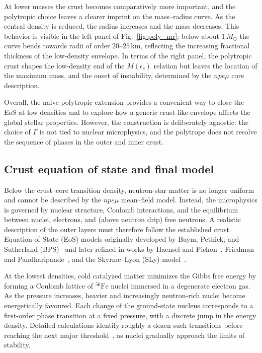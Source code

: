 At lower masses the crust becomes comparatively more important, and the
polytropic choice leaves a clearer imprint on the mass–radius curve. As
the central density is reduced, the radius increases and the
mass decreases. This behavior
is visible in the left panel of Fig.~\ref{fig:poly_mr}: below about
$1\,M_{\odot}$ the curve bends towards radii of order $20$–$25\,$km,
reflecting the increasing fractional thickness of the low-density
envelope. In terms of the right panel, the polytropic crust shapes the
low-density end of the $M(\epsilon_{c})$ relation but leaves the location
of the maximum mass, and the onset of instability, 
determined by the $npe\mu$ core description.

Overall, the naive polytropic extension provides a convenient way to close
the EoS at low densities and to explore how a generic crust-like envelope
affects the global stellar properties. However, the construction is
deliberately agnostic: the choice of $\Gamma$ is not tied to nuclear
microphysics, and the polytrope does not resolve the sequence of phases in
the outer and inner crust.


\subsection*{Crust equation of state and final model}
\label{subsec:crust_results}

Below the crust--core transition density, neutron-star matter is no longer
uniform and cannot be described by the $npe\mu$ mean–field model. Instead,
the microphysics is governed by nuclear structure, Coulomb interactions, and
the equilibrium between nuclei, electrons, and (above neutron drip) free
neutrons. A realistic description of the outer layers must therefore follow
the established crust Equation of State (EoS) models originally developed by
Baym, Pethick, and Sutherland (BPS)~\cite{bps1971} and later refined in works
by Haensel and Pichon~\cite{haensel_pichon1993}, Friedman and
Pandharipande~\cite{pr1989}, and the Skyrme–Lyon (SLy) model~\cite{sly2001}.

At the lowest densities, cold catalyzed matter minimizes the Gibbs free
energy by forming a Coulomb lattice of ${}^{56}\mathrm{Fe}$ nuclei immersed in a
degenerate electron gas. As the pressure increases, heavier and increasingly
neutron-rich nuclei become energetically favoured. Each change of the
ground-state nucleus corresponds to a first-order phase transition at a fixed
pressure, with a discrete jump in the energy density. Detailed calculations
identify roughly a dozen such transitions before reaching the next major
threshold~\cite{haensel_pichon1993}, as nuclei gradually approach the limits
of stability.


